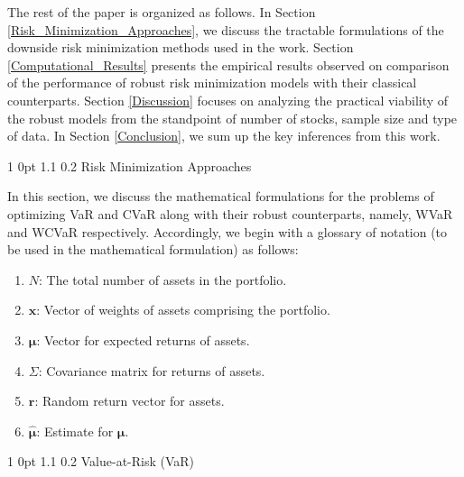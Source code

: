 \documentclass[12pt]{article}
\makeatletter
\numberwithin{equation}{section}
\renewcommand{\section}{
  \@startsection
  {section}%
  {1}%
  {0pt}%
  {1.1\baselineskip}%
  {0.2\baselineskip}%
  {\sc \centering}%
}
\renewcommand{\subsection}{
  \@startsection
  {subsection}%
  {1}%
  {0pt}%
  {1.1\baselineskip}%
  {0.2\baselineskip}%
  {\sc \centering}%
}
\makeatother
\begin{document}
The rest of the paper is organized as follows. In Section \ref{Risk_Minimization_Approaches}, we discuss the tractable formulations of the downside risk minimization methods used in the work. Section \ref{Computational_Results} presents the empirical results observed on comparison of the performance of robust risk minimization models with their classical counterparts. Section \ref{Discussion} focuses on analyzing the practical viability of the robust models from the standpoint of number of stocks, sample size and type of data. In Section \ref{Conclusion}, we sum up the key inferences from this work.

\section{Risk Minimization Approaches}
\label{Risk_Minimization_Approaches}

In this section, we discuss the mathematical formulations for the problems of optimizing VaR and CVaR along with their robust counterparts, namely,
WVaR and WCVaR respectively. Accordingly, we begin with a glossary of notation (to be used in the mathematical formulation) as follows:
\begin{enumerate}
\item $N$: The total number of assets in the portfolio.
\item $\displaystyle{\mathbf{x}}$: Vector of weights of assets comprising the portfolio.
\item $\displaystyle{\boldsymbol{\mu}}$: Vector for expected returns of assets.
\item $\displaystyle{\Sigma}$: Covariance matrix for returns of assets.
\item $\displaystyle{\boldsymbol{r}}$: Random return vector for assets.
\item $\displaystyle{\boldsymbol{{\hat{\mu}}}}$: Estimate for $\displaystyle{\boldsymbol{\mu}}$.
\end{enumerate}

\subsection{Value-at-Risk (VaR)}
\end{document}
